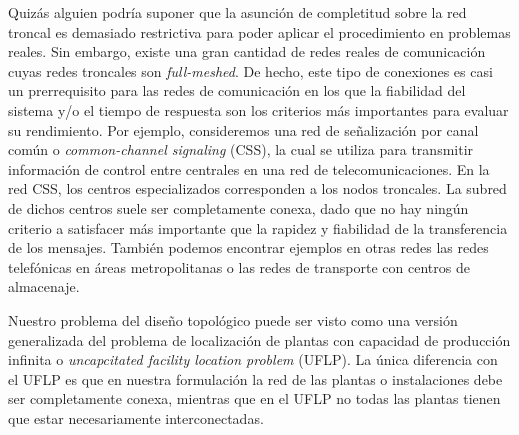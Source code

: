 \documentclass[twoside,12pt]{article}
\begin{document}
Quizás alguien podría suponer que la asunción de completitud sobre la red troncal es demasiado restrictiva para poder aplicar el procedimiento en problemas reales. Sin embargo, existe una gran cantidad de redes reales de comunicación cuyas redes troncales son \textit{full-meshed}. De hecho, este tipo de conexiones es casi un prerrequisito para las redes de comunicación en los que la fiabilidad del sistema y/o el tiempo de respuesta son los criterios más importantes para evaluar su rendimiento. Por ejemplo, consideremos una red de señalización por canal común o \textit{common-channel signaling} (CSS), la cual se utiliza para transmitir información de control entre centrales en una red de telecomunicaciones. En la red CSS, los centros especializados corresponden a los nodos troncales. La subred de dichos centros suele ser completamente conexa, dado que no hay ningún criterio a satisfacer más importante que la rapidez y fiabilidad de la transferencia de los mensajes. También podemos encontrar ejemplos en otras redes las redes telefónicas en áreas metropolitanas o las redes de transporte con centros de almacenaje. 

Nuestro problema del diseño topológico puede ser visto como una versión generalizada del problema de localización de plantas con capacidad de producción infinita o \textit{uncapcitated facility location problem} (UFLP). La única diferencia con el UFLP es que en nuestra formulación la red de las plantas o instalaciones debe ser completamente conexa, mientras que en el UFLP no todas las plantas tienen que estar necesariamente interconectadas.
\end{document}
